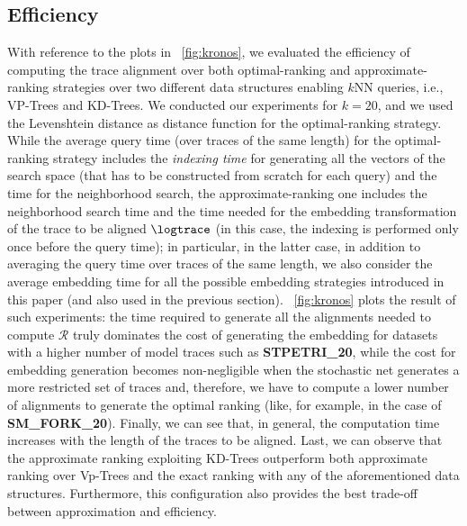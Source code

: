 \subsection{Efficiency}\label{subsec:efficio}
With reference to the plots in \figurename~\ref{fig:kronos}, we evaluated the efficiency of computing the trace alignment over both optimal-ranking   and approximate-ranking   strategies over two different data structures enabling $k$NN queries, i.e., VP-Trees and KD-Trees. We conducted our experiments for $k=20$, and we used the Levenshtein distance as distance function for the optimal-ranking strategy. While the average query time (over traces of the same length) for the optimal-ranking strategy includes the \textit{indexing time} for generating all the vectors of the search space (that has to be constructed from scratch for each query) and the time for the neighborhood search, the approximate-ranking one includes the neighborhood search time and the time needed for the embedding transformation of the trace to be aligned $\logtrace$ (in this case, the indexing is performed only once before the query time); in particular, in the latter case, in addition to averaging the query time over traces of the same length, we also consider the average embedding time for all the possible embedding strategies introduced in this paper (and also used in the previous section). \figurename~\ref{fig:kronos} plots the result of such experiments: the time required to generate all the alignments needed to compute $\mathcal{R}$ truly dominates the cost of generating the embedding %
for datasets with a higher number of model traces such as \textbf{STPETRI\_20}, while the cost for embedding generation becomes non-negligible when the stochastic net generates a more restricted set of traces and, therefore, we have to compute a lower number of alignments to generate the optimal ranking (like, for example, in the case of \textbf{SM\_FORK\_20}). Finally, we can see that, in general, the computation time increases with the length of the traces to be aligned. Last, we can observe that the approximate ranking exploiting KD-Trees outperform both approximate ranking over Vp-Trees and the exact ranking with any of the aforementioned data structures. Furthermore, this configuration also provides the best trade-off between approximation and efficiency. 
